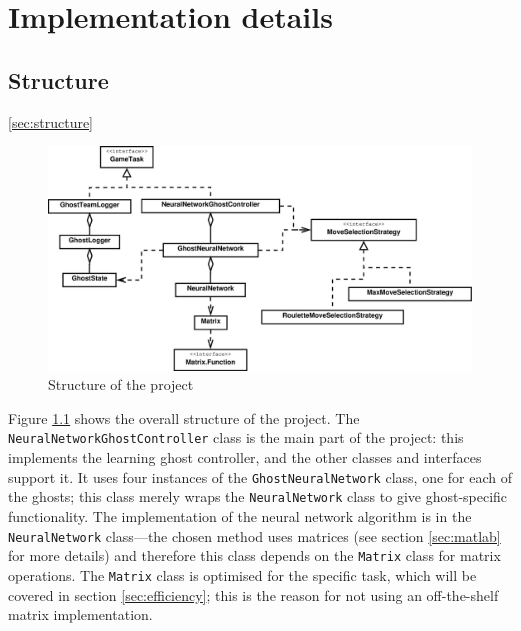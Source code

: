 \chapter{Implementation details}
\label{ch:implementation}

\section{Structure}
\ref{sec:structure}

\begin{figure}
\includegraphics[width=\linewidth]{diagrams/project2}
\caption{Structure of the project}
\label{fig:project}
\end{figure}

Figure \ref{fig:project} shows the overall structure of the project.  The {\tt NeuralNetworkGhostController} class is the main part of the project: this implements the learning ghost controller, and the other classes and interfaces support it.  It uses four instances of the {\tt GhostNeuralNetwork} class, one for each of the ghosts; this class merely wraps the {\tt NeuralNetwork} class to give ghost-specific functionality.  The implementation of the neural network algorithm is in the {\tt NeuralNetwork} class---the chosen method uses matrices (see section \ref{sec:matlab} for more details) and therefore this class depends on the {\tt Matrix} class for matrix operations.  The {\tt Matrix} class is optimised for the specific task, which will be covered in section \ref{sec:efficiency}; this is the reason for not using an off-the-shelf matrix implementation.

